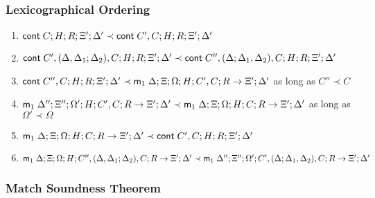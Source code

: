 \subsubsection{Lexicographical Ordering}

\begin{enumerate}
   \item $\mathsf{cont} \; C; H; R; \Xi'; \Delta' \prec \mathsf{cont} \; C', C; H; R; \Xi'; \Delta'$
   \item $\mathsf{cont} \; C', (\Delta, \Delta_1; \Delta_2), C; H; R; \Xi'; \Delta' \prec \mathsf{cont} \; C'', (\Delta; \Delta_1, \Delta_2), C; H; R; \Xi'; \Delta'$
   \item $\mathsf{cont} \; C'', C; H; R; \Xi'; \Delta' \prec \mathsf{m}_1 \; \Delta; \Xi; \Omega; H; C', C; R \rightarrow \Xi'; \Delta'$ as long as $C'' \prec C$
   \item $\mathsf{m}_1 \; \Delta''; \Xi''; \Omega'; H; C', C; R \rightarrow \Xi'; \Delta' \prec \mathsf{m}_1 \; \Delta; \Xi; \Omega; H; C; R \rightarrow \Xi'; \Delta'$ as long as $\Omega' \prec \Omega$
   \item $\mathsf{m}_1 \; \Delta; \Xi; \Omega; H; C; R \rightarrow \Xi'; \Delta' \prec \mathsf{cont} \; C', C; H; R; \Xi'; \Delta'$
   \item $\mathsf{m}_1 \; \Delta; \Xi; \Omega; H; C'', (\Delta, \Delta_1; \Delta_2), C; R \rightarrow \Xi'; \Delta' \prec \mathsf{m}_1 \; \Delta''; \Xi''; \Omega'; C', (\Delta; \Delta_1, \Delta_2), C; R \rightarrow \Xi'; \Delta'$
\end{enumerate}

\subsubsection{Match Soundness Theorem}\label{thm:match_soundness_basic}

